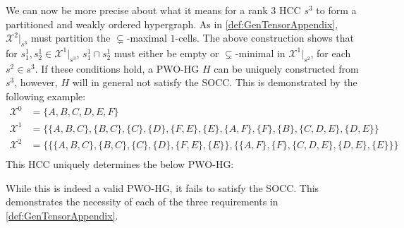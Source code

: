 \documentclass{article}
\theoremstyle{plain}
\theoremstyle{definition}
\theoremstyle{remark}
\newcommand{\cX}{\mathcal{X}}
\begin{document}
We can now be more precise about what it means for a rank $3$ HCC $s^3$ to form a partitioned and weakly ordered hypergraph. As in \cref{def:GenTensorAppendix}, $\cX^2|_{s^3}$ must partition the $\subsetneq$-maximal $1$-cells. The above construction shows that for $s^1_1, s^1_2 \in \cX^1|_{s^3}$, $s^1_1 \cap s^1_2$ must either be empty or $\subsetneq$-minimal in $\cX^1|_{s^2}$, for each $s^2 \in s^3$. If these conditions hold, a PWO-HG $H$ can be uniquely constructed from $s^3$, however, $H$ will in general not satisfy the SOCC. This is demonstrated by the following example:
\begin{equation*}
	\begin{aligned}
		\cX^0 &= \{A, B, C, D, E, F\}\\
		\cX^1 &= \big\{ \{A, B, C\}, \{B, C\}, \{C\}, \{D\}, \{F, E\}, \{E\}, \{A, F\}, \{F\}, \{B\}, \{C, D, E\}, \{D, E\} \big\}\\
		\cX^2 &= \Big\{ \big\{ \{A, B, C\}, \{B, C\}, \{C\}, \{D\}, \{F, E\}, \{E\} \big\}, \big\{ \{A, F\}, \{F\}, \{C, D, E\}, \{D, E\}, \{E\} \big\} \Big\}\\
	\end{aligned}
\end{equation*}
This HCC uniquely determines the below PWO-HG:
\begin{center}
\end{center}
While this is indeed a valid PWO-HG, it fails to satisfy the SOCC. This demonstrates the necessity of each of the three requirements in \cref{def:GenTensorAppendix}.
\end{document}
